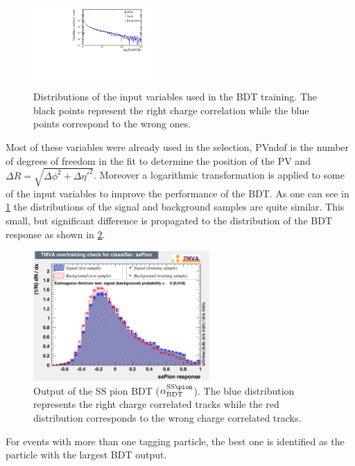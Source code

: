 \begin{figure}[tbp]
\begin{center}
		\includegraphics[width=0.40\textwidth]{09FlavourTagging/figs/BDT_PIDNNk_flat.pdf}
	\end{center}
	\caption{Distributions of the input variables used in the BDT training.
	The black points represent the right charge correlation while the blue points correspond to the wrong ones.}
	\label{fig:BDTInputSSPion}
\end{figure}
Most of these variables were already used in the selection, PVndof is the number of degrees of freedom in the fit to determine the position of the \ac{PV} and $\Delta R=\sqrt{\Delta\phi^2+\Delta\eta'^2}$.
Moreover a logarithmic transformation is applied to some of the input variables to improve the performance of the BDT.
As one can see in \cref{fig:BDTInputSSPion} the distributions of the signal and background samples are quite similar.
This small, but significant difference is propagated to the distribution of the BDT response as shown in \cref{fig:BDTovertrainSSPion}.
\begin{figure}[tbp]
	\begin{center}
		\includegraphics[width=0.6\textwidth]{09FlavourTagging/figs/SSPionBDT_overtrain.pdf}
	\end{center}
	\caption{Output of the SS pion BDT ($\alpha^{\text{SS}\pion}_\text{BDT}$).
	The blue distribution represents the right charge correlated tracks while the red distribution corresponds to the wrong charge correlated tracks.}
	\label{fig:BDTovertrainSSPion}
\end{figure}
For events with more than one tagging particle, the best one is identified as the particle with the largest BDT output.

